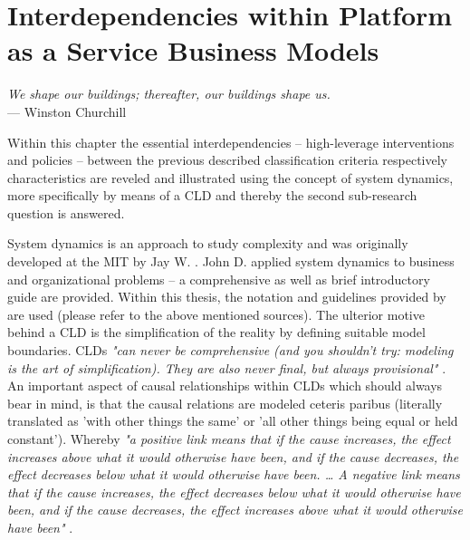 \chapter[Interdependencies within Platform as a Service Business Models]{Interdependencies within Platform as a Service Business Models}\label{ch:cld}

\begin{flushright}{\slshape    
	We shape our buildings; thereafter, our buildings shape us.} \\ \medskip
	--- Winston Churchill
\end{flushright}

Within this chapter the essential interdependencies -- high-leverage interventions and policies -- between the previous described classification criteria respectively characteristics are reveled and illustrated using the concept of system dynamics, more specifically by means of a \acf{CLD} and thereby the second sub-research question is answered. 

System dynamics is an approach to study complexity and was originally developed at the \ac{MIT} by Jay W. \citet{Forrester1961}. John D. \citeauthor{Sterman2000} applied system dynamics to business and organizational problems -- a comprehensive \citep{Sterman2000} as well as brief \citep{Sterman2001} introductory guide are provided. Within this thesis, the notation and guidelines provided by \citeauthor{Sterman2000} are used (please refer to the above mentioned sources). The ulterior motive behind a \ac{CLD} is the simplification of the reality by defining suitable model boundaries. \acp{CLD} \textit{"can never be comprehensive (and you shouldn't try: modeling is the art of simplification). They are also never final, but always provisional"} \citep[p. 166]{Sterman2000}. An important aspect of causal relationships within \acp{CLD} which should always bear in mind, is that the causal relations are modeled ceteris paribus (literally translated as 'with other things the same' or 'all other things being equal or held constant'). Whereby \textit{"a positive link means that if the cause increases, the effect increases above what it would otherwise have been, and if the cause decreases, the effect decreases below what it would otherwise have been. \ldots\xspace A negative link means that if the cause increases, the effect decreases below what it would otherwise have been, and if the cause decreases, the effect increases above what it would otherwise have been"} \citep[p. 139]{Sterman2000}.

